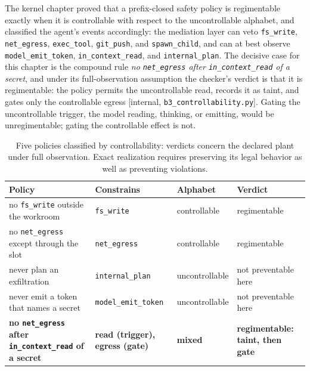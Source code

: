 \documentclass[11pt,a4paper]{article}
\theoremstyle{definition}
\begin{document}
{\sloppy The kernel chapter proved that a prefix-closed safety policy is regimentable
exactly when it is controllable with respect to the uncontrollable alphabet,
and classified the agent's events accordingly: the mediation layer can veto
\texttt{fs\_write}, \texttt{net\_egress}, \texttt{exec\_tool},
\texttt{git\_push}, and \texttt{spawn\_child}, and can at best observe
\texttt{model\_emit\_token}, \texttt{in\_context\_read}, and
\texttt{internal\_plan}. The decisive case for this chapter is the compound
rule \emph{no \texttt{net\_egress} after \texttt{in\_context\_read} of a
secret}, and under its full-observation assumption the checker's verdict is that it is regimentable: the policy
permits the uncontrollable read, records it as taint, and gates only the
controllable egress [internal, \texttt{b3\_controllability.py}]. Gating the
uncontrollable trigger, the model reading, thinking, or emitting, would be
unregimentable; gating the controllable effect is not.\par}

\begin{table}[H]\centering\footnotesize
\caption{Five policies classified by controllability: verdicts concern the declared plant under full observation. Exact realization requires preserving its legal behavior as well as preventing violations.}
\label{tab:sealed-policy-classification}
\begin{tabularx}{\textwidth}{@{}>{\raggedright\arraybackslash}X >{\raggedright\arraybackslash}p{2.1cm} >{\raggedright\arraybackslash}p{2.3cm} >{\raggedright\arraybackslash}p{2.1cm}@{}}
\toprule
Policy & Constrains & Alphabet & Verdict \\
\midrule
no \texttt{fs\_write} outside the workroom & \texttt{fs\_write} & controllable & regimentable \\
no \texttt{net\_egress} except through the slot & \texttt{net\_egress} & controllable & regimentable \\
never plan an exfiltration & \texttt{internal\_plan} & uncontrollable & not preventable here \\
never emit a token that names a secret & \texttt{model\_emit\_token} & uncontrollable & not preventable here \\
\textbf{no \texttt{net\_\allowbreak egress} after \texttt{in\_\allowbreak context\_\allowbreak read} of a secret} & \textbf{read (trigger), egress (gate)} & \textbf{mixed} & \textbf{regimentable: taint, then gate} \\
\bottomrule
\end{tabularx}
\end{table}
\end{document}
